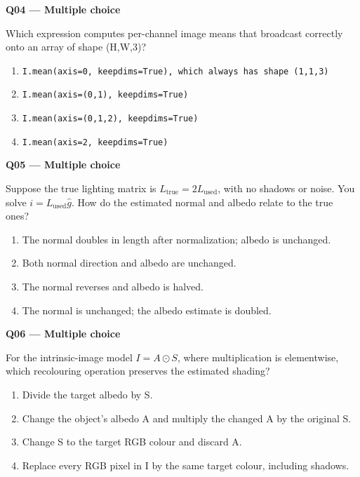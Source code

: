 \documentclass[11pt,a4paper]{article}
\begin{document}
\par\vspace{12pt}
\begin{minipage}{\linewidth}
\textbf{Q04 — Multiple choice}\par\smallskip
Which expression computes per-channel image means that broadcast correctly onto an array of shape (H,\allowbreak{}W,\allowbreak{}3)?
\begin{enumerate}[label=\textbf{\Alph*.}]
\item \texttt{I.mean(axis=\allowbreak{}0,\allowbreak{} keepdims=\allowbreak{}True),\allowbreak{} which always has shape (1,\allowbreak{}1,\allowbreak{}3)}
\item \texttt{I.mean(axis=\allowbreak{}(0,\allowbreak{}1),\allowbreak{} keepdims=\allowbreak{}True)}
\item \texttt{I.mean(axis=\allowbreak{}(0,\allowbreak{}1,\allowbreak{}2),\allowbreak{} keepdims=\allowbreak{}True)}
\item \texttt{I.mean(axis=\allowbreak{}2,\allowbreak{} keepdims=\allowbreak{}True)}
\end{enumerate}
\end{minipage}
\par\vspace{12pt}
\begin{minipage}{\linewidth}
\textbf{Q05 — Multiple choice}\par\smallskip
Suppose the true lighting matrix is \(L_{\mathrm{true}}=2L_{\mathrm{used}}\),\allowbreak{} with no shadows or noise. You solve \(i=L_{\mathrm{used}}\widehat g\). How do the estimated normal and albedo relate to the true ones?
\begin{enumerate}[label=\textbf{\Alph*.}]
\item The normal doubles in length after normalization; albedo is unchanged.
\item Both normal direction and albedo are unchanged.
\item The normal reverses and albedo is halved.
\item The normal is unchanged; the albedo estimate is doubled.
\end{enumerate}
\end{minipage}
\par\vspace{12pt}
\begin{minipage}{\linewidth}
\textbf{Q06 — Multiple choice}\par\smallskip
For the intrinsic-image model \(I=A\odot S\),\allowbreak{} where multiplication is elementwise,\allowbreak{} which recolouring operation preserves the estimated shading?
\begin{enumerate}[label=\textbf{\Alph*.}]
\item Divide the target albedo by S.
\item Change the object's albedo A and multiply the changed A by the original S.
\item Change S to the target RGB colour and discard A.
\item Replace every RGB pixel in I by the same target colour,\allowbreak{} including shadows.
\end{enumerate}
\end{minipage}
\end{document}
